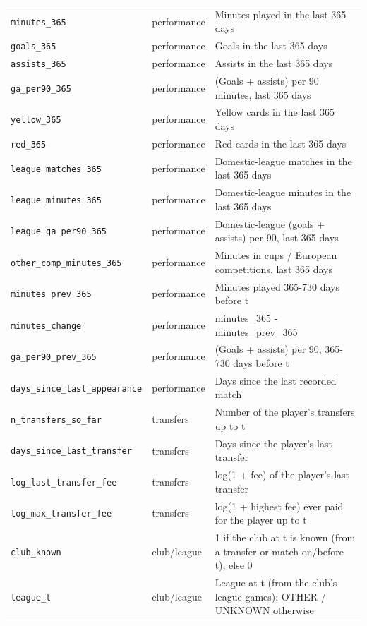 \begin{table}[t]
\begin{tabular}{llp{11.5cm}}
\texttt{minutes\_365} & performance & Minutes played in the last 365 days \\
\texttt{goals\_365} & performance & Goals in the last 365 days \\
\texttt{assists\_365} & performance & Assists in the last 365 days \\
\texttt{ga\_per90\_365} & performance & (Goals + assists) per 90 minutes, last 365 days \\
\texttt{yellow\_365} & performance & Yellow cards in the last 365 days \\
\texttt{red\_365} & performance & Red cards in the last 365 days \\
\texttt{league\_matches\_365} & performance & Domestic-league matches in the last 365 days \\
\texttt{league\_minutes\_365} & performance & Domestic-league minutes in the last 365 days \\
\texttt{league\_ga\_per90\_365} & performance & Domestic-league (goals + assists) per 90, last 365 days \\
\texttt{other\_comp\_minutes\_365} & performance & Minutes in cups / European competitions, last 365 days \\
\texttt{minutes\_prev\_365} & performance & Minutes played 365-730 days before t \\
\texttt{minutes\_change} & performance & minutes\_365 - minutes\_prev\_365 \\
\texttt{ga\_per90\_prev\_365} & performance & (Goals + assists) per 90, 365-730 days before t \\
\texttt{days\_since\_last\_appearance} & performance & Days since the last recorded match \\
\texttt{n\_transfers\_so\_far} & transfers & Number of the player's transfers up to t \\
\texttt{days\_since\_last\_transfer} & transfers & Days since the player's last transfer \\
\texttt{log\_last\_transfer\_fee} & transfers & log(1 + fee) of the player's last transfer \\
\texttt{log\_max\_transfer\_fee} & transfers & log(1 + highest fee) ever paid for the player up to t \\
\texttt{club\_known} & club/league & 1 if the club at t is known (from a transfer or match on/before t), else 0 \\
\texttt{league\_t} & club/league & League at t (from the club's league games); OTHER / UNKNOWN otherwise \\

\end{tabular}
\end{table}
